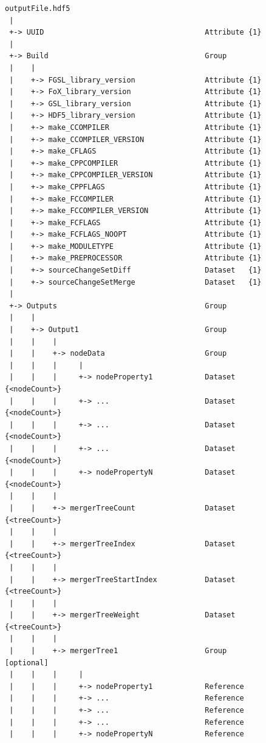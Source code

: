\begin{figure}
\begin{center}
\begin{verbatim}
outputFile.hdf5
 |
 +-> UUID                                     Attribute {1}
 |
 +-> Build                                    Group
 |    |
 |    +-> FGSL_library_version                Attribute {1}
 |    +-> FoX_library_version                 Attribute {1}
 |    +-> GSL_library_version                 Attribute {1}
 |    +-> HDF5_library_version                Attribute {1}
 |    +-> make_CCOMPILER                      Attribute {1}
 |    +-> make_CCOMPILER_VERSION              Attribute {1}
 |    +-> make_CFLAGS                         Attribute {1}
 |    +-> make_CPPCOMPILER                    Attribute {1}
 |    +-> make_CPPCOMPILER_VERSION            Attribute {1}
 |    +-> make_CPPFLAGS                       Attribute {1}
 |    +-> make_FCCOMPILER                     Attribute {1}
 |    +-> make_FCCOMPILER_VERSION             Attribute {1}
 |    +-> make_FCFLAGS                        Attribute {1}
 |    +-> make_FCFLAGS_NOOPT                  Attribute {1}
 |    +-> make_MODULETYPE                     Attribute {1}
 |    +-> make_PREPROCESSOR                   Attribute {1}
 |    +-> sourceChangeSetDiff                 Dataset   {1}
 |    +-> sourceChangeSetMerge                Dataset   {1}
 |
 +-> Outputs                                  Group
 |    |
 |    +-> Output1                             Group
 |    |    |
 |    |    +-> nodeData                       Group
 |    |    |     |
 |    |    |     +-> nodeProperty1            Dataset {<nodeCount>}
 |    |    |     +-> ...                      Dataset {<nodeCount>}
 |    |    |     +-> ...                      Dataset {<nodeCount>}
 |    |    |     +-> ...                      Dataset {<nodeCount>}
 |    |    |     +-> nodePropertyN            Dataset {<nodeCount>}
 |    |    |
 |    |    +-> mergerTreeCount                Dataset {<treeCount>}
 |    |    |
 |    |    +-> mergerTreeIndex                Dataset {<treeCount>}
 |    |    |
 |    |    +-> mergerTreeStartIndex           Dataset {<treeCount>}
 |    |    |
 |    |    +-> mergerTreeWeight               Dataset {<treeCount>}
 |    |    |
 |    |    +-> mergerTree1                    Group              [optional]
 |    |    |     |
 |    |    |     +-> nodeProperty1            Reference
 |    |    |     +-> ...                      Reference
 |    |    |     +-> ...                      Reference
 |    |    |     +-> ...                      Reference
 |    |    |     +-> nodePropertyN            Reference

\end{verbatim}
\end{center}
\end{figure}
